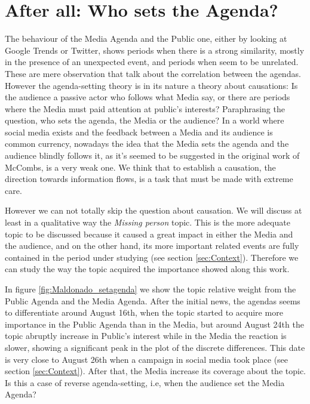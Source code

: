 \section{After all: Who sets the Agenda?}
\label{sec:who_sets}

\par The behaviour of the Media Agenda and the Public one, either by looking at Google Trends or Twitter, shows periods when there is a strong similarity, mostly in the presence of an unexpected event, and periods when seem to be unrelated.
These are mere observation that talk about the correlation between the agendas.
However the agenda-setting theory is in its nature a theory about causations:
Is the audience a passive actor who follows what Media say, or there are periods where the Media must paid attention at public's interests?
Paraphrasing the question, who sets the agenda, the Media or the audience?
In a world where social media exists and the feedback between a Media and its audience is common currency, nowadays the idea that the Media sets the agenda and the audience blindly follows it, as it's seemed to be suggested in the original work of McCombs, is a very weak one. 
We think that to establish a causation, the direction towards information flows, is a task that must be made with extreme care. 
\par However we can not totally skip the question about causation. 
We will discuss at least in a qualitative way the \emph{Missing person} topic. 
This is the more adequate topic to be discussed because it caused a great impact in either the Media and the audience, and on the other hand, its more important related events are fully contained in the period under studying (see section \ref{sec:Context}).
Therefore we can study the way the topic acquired the importance showed along this work.
\par In figure \ref{fig:Maldonado_setagenda} we show the topic relative weight from the Public Agenda and the Media Agenda. 
After the initial news, the agendas seems to differentiate around August 16th, when the topic started to acquire more importance in the Public Agenda than in the Media, but around August 24th the topic abruptly increase in Public's interest while in the Media the reaction is slower, showing a significant peak in the plot of the discrete differences.
This date is very close to August 26th when a campaign in social media took place (see section \ref{sec:Context}). After that, the Media increase its coverage about the topic.
Is this a case of reverse agenda-setting, i.e, when the audience set the Media Agenda? 
